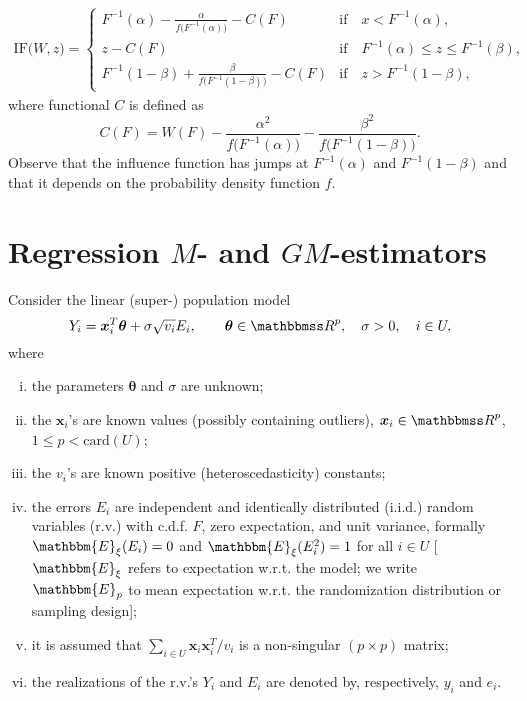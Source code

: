 \documentclass[a4paper,oneside,11pt,DIV=12]{scrartcl}
\newcommand{\R}{{\mathbbmss R}}         %
\theoremstyle{remark}
\begin{document}
\begin{align*}
   \mathrm{IF}\big(W, z\big) =
   \begin{cases}
      F^{-1}(\alpha) - \frac{\alpha}{f\big(F^{-1}(\alpha)\big)} - C(F) & \text{if} \quad x < F^{-1}(\alpha),\\
      z - C(F) & \text{if} \quad F^{-1}(\alpha) \leq z \leq F^{-1}(\beta),\\
      F^{-1}(1-\beta) + \frac{\beta}{f\big(F^{-1}(1-\beta)\big)}- C(F) & \text{if} \quad z > F^{-1}(1-\beta),
   \end{cases}
\end{align*}
\noindent where functional $C$ is defined as
\begin{equation*}
   C(F) = W(F) - \frac{\alpha^2}{f\big(F^{-1}(\alpha)\big)} - \frac{\beta^2}{f\big(F^{-1}(1-\beta)\big)}.
\end{equation*}
\noindent Observe that the influence function has jumps at $F^{-1}(\alpha)$ and $F^{-1}(1-\beta)$ and that it depends on the probability density function $f$.



\section{Regression $M$- and $GM$-estimators}
Consider the linear (super-) population model
\begin{equation}\label{eq:reg_model}
    Y_i = \bm x_i^T \bm \theta + \sigma \sqrt{v_i}E_i, \qquad \bm \theta \in \R^p, \quad \sigma > 0, \quad i \in U,
\end{equation}
\noindent where
\begin{enumerate}[i)]
    \item the parameters $\bm \theta $ and $\sigma$ are unknown;
    \item the $\bm x_i$'s are known values (possibly containing outliers), $\bm x_i \in \R^p$, $1 \leq p < \mathrm{card}(U)$;
    \item the $v_i$'s are known positive (heteroscedasticity) constants;
    \item the errors $E_i$ are independent and identically distributed (i.i.d.) random variables (r.v.) with c.d.f. $F$, zero expectation, and unit variance, formally $\mathbbm{E}_{\xi}(E_i) = 0$ and $\mathbbm{E}_{\xi}(E_i^2)=1$ for all $i\in U$ [$\mathbbm{E}_{\xi}$ refers to expectation w.r.t. the model; we write $\mathbbm{E}_p$ to mean expectation w.r.t. the randomization distribution or sampling design];
    \item it is assumed that $\sum_{i \in U} \bm x_i \bm x_i^T / v_i$ is a non-singular $(p \times p)$ matrix;
    \item the realizations of the r.v.'s $Y_i$ and $E_i$ are denoted by, respectively, $y_i$ and $e_i$.
\end{enumerate}
\end{document}
